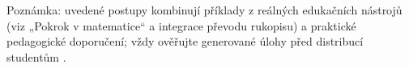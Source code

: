\medskip
Poznámka: uvedené postupy kombinují příklady z reálných edukačních nástrojů (viz „Pokrok v matematice“ a integrace převodu rukopisu) a praktické pedagogické doporučení; vždy ověřujte generované úlohy před distribucí studentům \cite{kb_ai_101_tipu_pdf_04e4a115_page_8_1,kb_ai_101_tipu_pdf_04e4a115_page_14_1,kb_ai_101_tipu_pdf_04e4a115_page_15_2}.